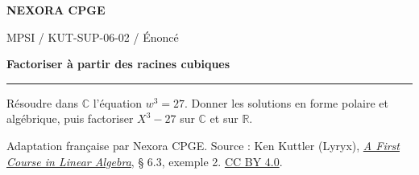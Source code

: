 \documentclass[11pt,a4paper]{article}
\begin{document}
{\small\bfseries\color{nexorablue} NEXORA CPGE}\par
{\small MPSI / KUT-SUP-06-02 / Énoncé}\par
{\LARGE\bfseries Factoriser à partir des racines cubiques}\par
\vspace{0.25em}\hrule\vspace{0.6em}

Résoudre dans $\mathbb C$ l’équation $w^3=27$. Donner les solutions en forme polaire et algébrique, puis factoriser $X^3-27$ sur $\mathbb C$ et sur $\mathbb R$.

\bigskip
{\footnotesize Adaptation française par Nexora CPGE. Source : Ken Kuttler (Lyryx),
\href{https://math.libretexts.org/Bookshelves/Linear_Algebra/A_First_Course_in_Linear_Algebra_(Kuttler)/06:_Complex_Numbers/6.03:_Roots_of_Complex_Numbers}{\textit{A First Course in Linear Algebra}}, § 6.3, exemple 2.
\href{https://creativecommons.org/licenses/by/4.0/}{CC BY 4.0}.}
\end{document}
